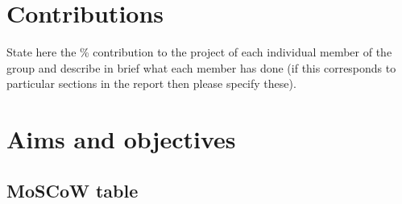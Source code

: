 \documentclass[a4paper, oneside, 11pt]{report}
\begin{document}

\raggedright



\appendix
\chapter{Contributions}

State here the \% contribution to the project of each individual member of the group and describe in brief what each member has done (if this corresponds to particular sections in the report then please specify these).

\chapter{Aims and objectives}
\section{MoSCoW table}
\label{appendix:moscow}
\end{document}
